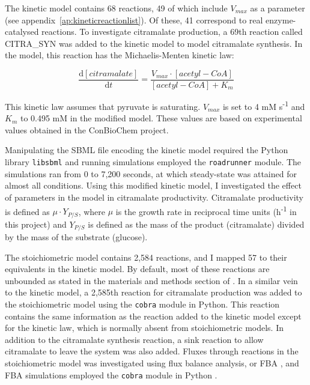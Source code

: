 \documentclass[parskip=full, numbers=noenddot]{scrreprt}
\begin{document}
The kinetic model contains 68 reactions, 49 of which include $V_{max}$ as a parameter (see appendix~\ref{ap:kineticreactionlist}). Of these, 41 correspond to real enzyme-catalysed reactions.
To investigate citramalate production, a 69th reaction called CITRA\_SYN was added to the kinetic model to model citramalate synthesis.  In the model, this reaction has the Michaelis-Menten kinetic law:

\[
  \frac{\mathrm{d}[citramalate]}{\mathrm{d}t} = 
  \frac{V_{max} \cdot [acetyl-CoA]}{[acetyl-CoA] + K_{m}}
\]

This kinetic law assumes that pyruvate is saturating. $V_{max}$ is set to 4 mM s\textsuperscript{-1} and $K_{m}$ to 0.495 mM in the modified model. These values are based on experimental values obtained in the ConBioChem project.

Manipulating the SBML file encoding the kinetic model required the Python library \texttt{libsbml} \citep{bornstein_libsbml:_2008} and running simulations employed the \texttt{roadrunner} \citep{somogyi_libroadrunner:_2015} module. The simulations ran from 0 to 7,200 seconds, at which steady-state was attained for almost all conditions.
Using this modified kinetic model, I investigated the effect of parameters in the model in citramalate productivity. Citramalate productivity is defined as $\mu \cdot Y_{P/S}$, where $\mu$ is the growth rate in reciprocal time units (h\textsuperscript{-1} in this project) and $Y_{P/S}$ is defined as the mass of the product (citramalate) divided by the mass of the substrate (glucose).


The stoichiometric model contains 2,584 reactions, and I mapped 57 to their equivalents in the kinetic model. By default, most of these reactions are unbounded as stated in the materials and methods section of \citet{orth_comprehensive_2011}.
In a similar vein to the kinetic model, a 2,585th reaction for citramalate production was added to the stoichiometric model using the \texttt{cobra} module in Python. This reaction contains the same information as the reaction added to the kinetic model except for the kinetic law, which is normally absent from stoichiometric models. In addition to the citramalate synthesis reaction, a sink reaction to allow citramalate to leave the system was also added.
Fluxes through reactions in the stoichiometric model was investigated using flux balance analysis, or FBA \citep{orth_what_2010}, and FBA simulations employed the \texttt{cobra} module in Python \citep{ebrahim_cobrapy:_2013}.
\end{document}
